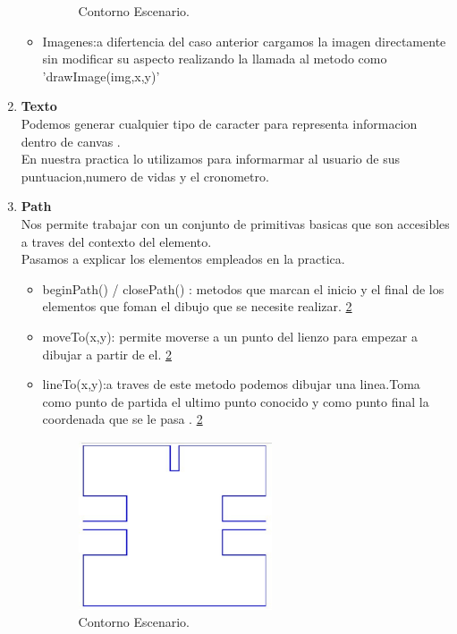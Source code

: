 \begin{enumerate}
\begin{itemize}
\begin{figure}[h]
\begin{center}
	\decoRule
	\caption[Contorno Escenario]{Contorno Escenario.}
\label{fig:canvasPrimitivas}
\end{center}\end{figure}
\item Imagenes:a difertencia del caso anterior cargamos la imagen directamente sin modificar su aspecto realizando la llamada al metodo  como 'drawImage(img,x,y)' 
\end{itemize}

\item \textbf{Texto}\\Podemos generar cualquier tipo de caracter para representa informacion dentro  de canvas .\\En nuestra practica lo utilizamos para informarmar al usuario de sus puntuacion,numero de vidas y el cronometro.
\item \textbf{Path}\\Nos permite trabajar con un conjunto de  primitivas basicas que son accesibles a traves del contexto del elemento.\\Pasamos a explicar los elementos empleados en la practica. 
\begin{itemize}
\item beginPath() / closePath() : metodos que marcan el inicio y el final de los elementos que foman el dibujo que se necesite realizar. \ref{fig:canvasPrimitivas}
\item moveTo(x,y): permite moverse a un punto del lienzo para empezar a dibujar a partir de el. \ref{fig:canvasPrimitivas}
\item lineTo(x,y):a traves de este metodo podemos  dibujar una linea.Toma como punto de partida el ultimo punto conocido y como  punto final  la coordenada que se le pasa . \ref{fig:canvasPrimitivas} \begin{figure}[h]
\begin{center}
   \includegraphics[width=0.4\linewidth, height=5cm]{Figures/canvasPrimitivas}
	\decoRule
	\caption[Contorno Escenario]{Contorno Escenario.}
\label{fig:canvasPrimitivas}

\end{center}
\end{figure}
\end{itemize}
\end{enumerate}
